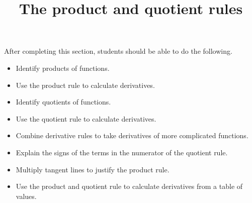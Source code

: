 \documentclass{ximera}
\title{The product and quotient rules}
\begin{document}
\begin{abstract}
\end{abstract}

\maketitle

\begin{sectionOutcomes}

After completing this section, students should be able to do the following.

\begin{itemize}
	\item Identify products of functions.
	\item Use the product rule to calculate derivatives.
	\item Identify quotients of functions.
	\item Use the quotient rule to calculate derivatives.
	\item Combine derivative rules to take derivatives of more complicated functions.
        \item Explain the signs of the terms in the numerator of the quotient rule.
        \item Multiply tangent lines to justify the product rule.
	\item Use the product and quotient rule to calculate derivatives from a table of values.
\end{itemize}

\end{sectionOutcomes}
\end{document}
